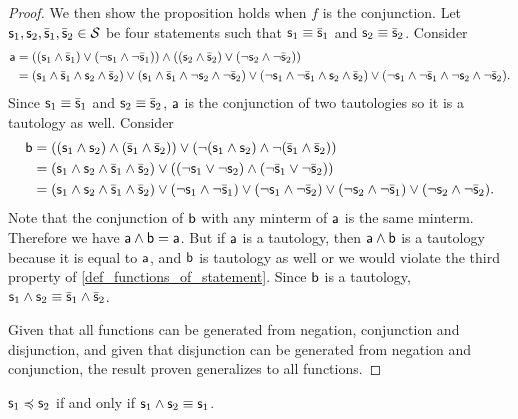 \documentclass[11pt,letterpaper,fleqn]{memoir} %
\begin{document}
\begin{mathSection}
\begin{proof}
		We then show the proposition holds when $f$ is the conjunction. Let $\stmt_1, \stmt_2, \bar{\stmt}_1, \bar{\stmt}_2 \in \mathcal{S}$ be four statements such that $\stmt_1 \equiv \bar{\stmt}_1$ and $\stmt_2 \equiv \bar{\stmt}_2$. Consider
		\begin{align*}
\stmt[a] &= ((\stmt_1 \AND \bar{\stmt}_1) \OR (\NOT \stmt_1 \AND \NOT \bar{\stmt}_1)) \AND ((\stmt_2 \AND \bar{\stmt}_2) \OR (\NOT \stmt_2 \AND \NOT \bar{\stmt}_2)) \\
&=(\stmt_1 \AND \bar{\stmt}_1 \AND \stmt_2 \AND \bar{\stmt}_2) \OR (\stmt_1 \AND \bar{\stmt}_1 \AND \NOT \stmt_2 \AND \NOT \bar{\stmt}_2) \OR (\NOT \stmt_1 \AND \NOT \bar{\stmt}_1 \AND \stmt_2 \AND \bar{\stmt}_2) \OR (\NOT \stmt_1 \AND \NOT \bar{\stmt}_1 \AND \NOT \stmt_2 \AND \NOT \bar{\stmt}_2).
		\end{align*}
		Since $\stmt_1 \equiv \bar{\stmt}_1$ and $\stmt_2 \equiv \bar{\stmt}_2$, $\stmt[a]$ is the conjunction of two tautologies so it is a tautology as well. Consider
		\begin{align*}
		\stmt[b] &= ((\stmt_1 \AND \stmt_2) \AND (\bar{\stmt}_1 \AND \bar{\stmt}_2)) \OR  (\NOT (\stmt_1 \AND \stmt_2) \AND \NOT (\bar{\stmt}_1 \AND \bar{\stmt}_2)) \\
		&= 	
		(\stmt_1 \AND \stmt_2 \AND \bar{\stmt}_1 \AND \bar{\stmt}_2) \OR ((\NOT \stmt_1 \OR \NOT \stmt_2) \AND (\NOT \bar{\stmt}_1 \OR \NOT \bar{\stmt}_2)) \\
		&= (\stmt_1 \AND \stmt_2 \AND \bar{\stmt}_1 \AND \bar{\stmt}_2) \OR (\NOT \stmt_1 \AND \NOT \bar{\stmt}_1) \OR (\NOT \stmt_1 \AND \NOT \bar{\stmt}_2) \OR (\NOT \stmt_2 \AND \NOT \bar{\stmt}_1) \OR (\NOT \stmt_2 \AND \NOT \bar{\stmt}_2).
		\end{align*}
		Note that the conjunction of $\stmt[b]$ with any minterm of $\stmt[a]$ is the same minterm. Therefore we have  $\stmt[a] \AND \stmt[b] = \stmt[a]$. But if $\stmt[a]$ is a tautology, then $\stmt[a] \AND \stmt[b]$ is a tautology because it is equal to $\stmt[a]$, and $\stmt[b]$ is tautology as well or we would violate the third property of \ref{def_functions_of_statement}. Since $\stmt[b]$ is a tautology, $\stmt_1 \AND \stmt_2 \equiv \bar{\stmt}_1 \AND \bar{\stmt}_2$.
		
		Given that all functions can be generated from negation, conjunction and disjunction, and given that disjunction can be generated from negation and conjunction, the result proven generalizes to all functions.
	\end{proof}
	
	\begin{prop}
		$\stmt_1 \narrower \stmt_2$ if and only if $\stmt_1 \AND \stmt_2 \equiv \stmt_1$.
	\end{prop}
	

\end{mathSection}
\end{document}
